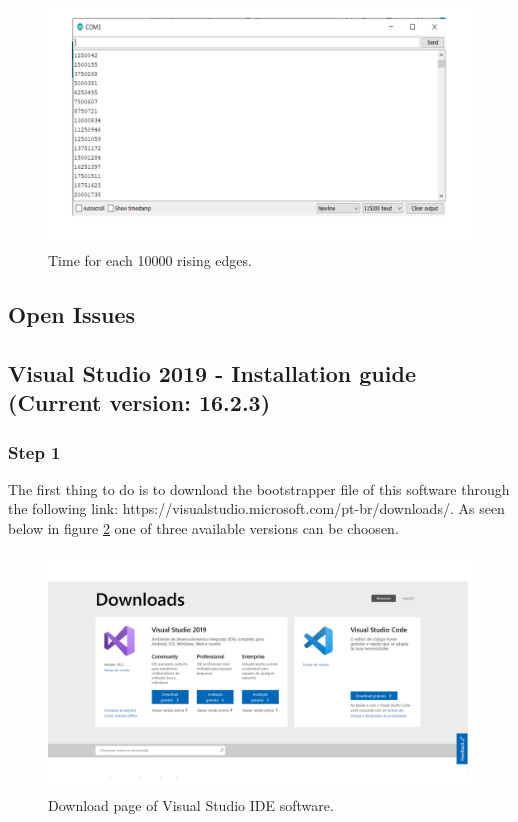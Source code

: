 \begin{refsection}
\begin{figure}[H]
	\centering
	\includegraphics[width=1\linewidth]{./sdf/arduino_quantum_rx/figures/Teste1.pdf}
	\caption{Time for each 10000 rising edges.}
	\label{montage}
\end{figure}
	
	\subsection{Open Issues}
	
	\clearpage
	\subsection{Visual Studio 2019 - Installation guide (Current version: 16.2.3)}
	
	\subsubsection{Step 1}
	
	The first thing to do is to download the bootstrapper file of this software through the following link: https://visualstudio.microsoft.com/pt-br/downloads/. As seen below in figure \ref{vstudio} one of three available versions can be choosen.
	
	\begin{figure}[H]
		\centering
		\includegraphics[width=1\linewidth]{./sdf/arduino_quantum_rx/figures/vsDownload.pdf}
		\caption{Download page of Visual Studio IDE software.}
		\label{vstudio}
	\end{figure}
	

\end{refsection}
